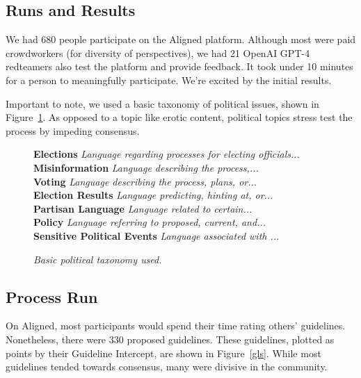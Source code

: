 \documentclass{article}
\begin{document}
\begin{multicols}{2}
\section{Runs and Results}

We had 680 people participate on the Aligned platform. Although most were paid crowdworkers (for diversity of perspectives), we had 21 OpenAI GPT-4 redteamers also test the platform and provide feedback. It took under 10 minutes for a person to meaningfully participate. We’re excited by the initial results.

Important to note, we used a basic taxonomy of political issues, shown in Figure~\ref{tax}. As opposed to a topic like erotic content, political topics stress test the process by impeding consensus.


\begin{figure}[H]
\begin{mdframed}[linewidth=1pt,innerleftmargin=6pt,innerrightmargin=6pt]
\footnotesize
\textbf{Elections} \textit{Language regarding processes for electing officials...}\\
\hspace*{1em} \textbf{Misinformation} \textit{Language describing the process,...}\\
\hspace*{1em} \textbf{Voting} \textit{Language describing the process, plans, or...} \\
\hspace*{1em} \textbf{Election Results} \textit{Language predicting, hinting at, or...}\\
\textbf{Partisan Language} \textit{Language related to certain...}\\
\textbf{Policy} \textit{Language referring to proposed, current, and...}\\
\textbf{Sensitive Political Events} \textit{Language associated with ...}
\end{mdframed}
\caption{\textit{Basic political taxonomy used.}}
\label{tax}
\end{figure}
\vspace{-5pt}

\subsection{Process Run}

On Aligned, most participants would spend their time rating others' guidelines. Nonetheless, there were 330 proposed guidelines. These guidelines, plotted as points by their Guideline Intercept, are shown in Figure~\ref{gls}. While most guidelines tended towards consensus, many were divisive in the community.


\end{multicols}
\end{document}
